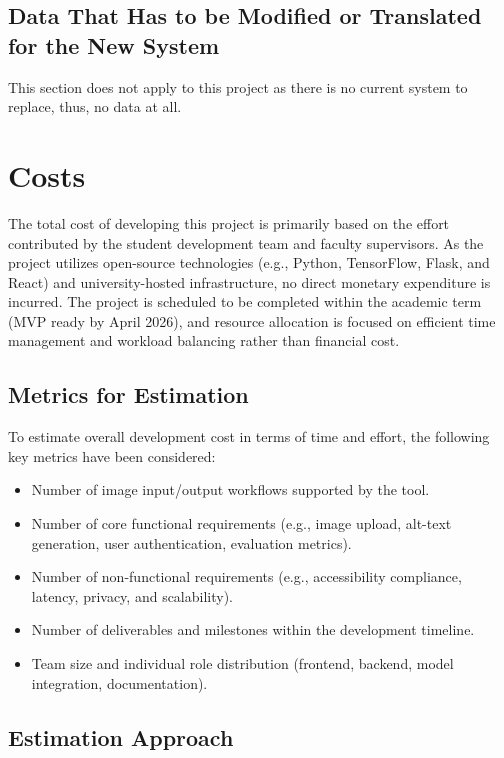 \documentclass[12pt]{article}
\begin{document}
\subsection{Data That Has to be Modified or Translated for the New System}
This section does not apply to this project as there is no current
system to replace, thus, no data at all.

\section{Costs}

The total cost of developing this project is primarily based on the
effort contributed by the student development team and faculty
supervisors. As the project utilizes open-source technologies (e.g.,
Python, TensorFlow, Flask, and React) and university-hosted
infrastructure, no direct monetary expenditure is incurred. The
project is scheduled to be completed within the academic term (MVP
ready by April 2026), and resource allocation is focused on efficient
time management and workload balancing rather than financial cost.

\subsection{Metrics for Estimation}

To estimate overall development cost in terms of time and effort, the
following key metrics have been considered:
\begin{itemize}
  \item Number of image input/output workflows supported by the tool.
  \item Number of core functional requirements (e.g., image upload,
    alt-text generation, user authentication, evaluation metrics).
  \item Number of non-functional requirements (e.g., accessibility
    compliance, latency, privacy, and scalability).
  \item Number of deliverables and milestones within the development timeline.
  \item Team size and individual role distribution (frontend,
    backend, model integration, documentation).
\end{itemize}

\subsection{Estimation Approach}
\end{document}
